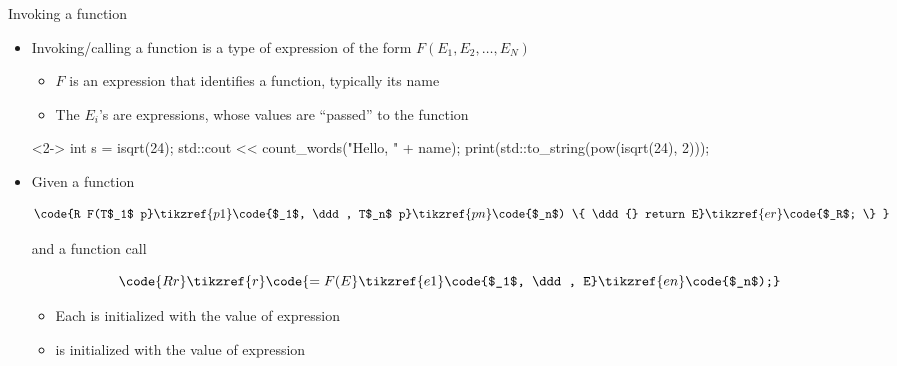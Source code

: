 \begin{frame}[fragile]{Invoking a function}

  \begin{itemize}
  \item Invoking/calling a function is a type of expression of the form $F(E_1,
    E_2, \ldots, E_N)$
    \begin{itemize}
    \item $F$ is an expression that identifies a function, typically its name
    \item The $E_i$'s are expressions, whose values are ``passed'' to the function
    \end{itemize}

    \begin{codeblock}<2->{
int s = isqrt(24);
std::cout <{}< count_words("Hello, " + name);
print(std::to_string(pow(isqrt(24), 2)));}\end{codeblock}

  \item<3-> Given a function


    \begin{equation*}
      \code{R F(T$_1$ p}\tikzref{p1}\code{$_1$, \ddd, T$_n$ p}\tikzref{pn}\code{$_n$) \{ \ddd{} return E}\tikzref{er}\code{$_R$; \} }
    \end{equation*}

    and a function call

    \begin{equation*}
      \code{R r}\tikzref{r}\code{ = F(E}\tikzref{e1}\code{$_1$, \ddd, E}\tikzref{en}\code{$_n$);}
    \end{equation*}

    \begin{itemize}
    \item<4-> Each  is initialized with the value of expression
    \item<5->  is initialized with the value of expression 
    \end{itemize}


  \end{itemize}

\end{frame}

